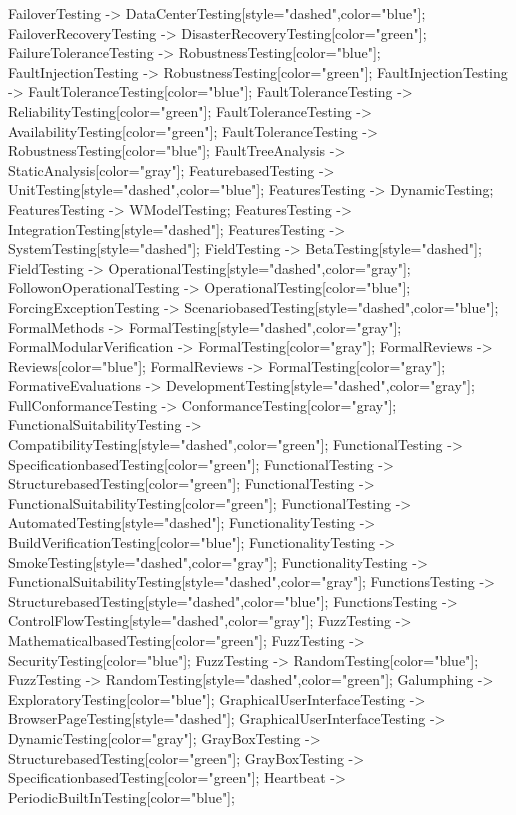 \documentclass{article}
\begin{document}
{FailoverTesting -> DataCenterTesting[style="dashed",color="blue"];
FailoverRecoveryTesting -> DisasterRecoveryTesting[color="green"];
FailureToleranceTesting -> RobustnessTesting[color="blue"];
FaultInjectionTesting -> RobustnessTesting[color="green"];
FaultInjectionTesting -> FaultToleranceTesting[color="blue"];
FaultToleranceTesting -> ReliabilityTesting[color="green"];
FaultToleranceTesting -> AvailabilityTesting[color="green"];
FaultToleranceTesting -> RobustnessTesting[color="blue"];
FaultTreeAnalysis -> StaticAnalysis[color="gray"];
FeaturebasedTesting -> UnitTesting[style="dashed",color="blue"];
FeaturesTesting -> DynamicTesting;
FeaturesTesting -> WModelTesting;
FeaturesTesting -> IntegrationTesting[style="dashed"];
FeaturesTesting -> SystemTesting[style="dashed"];
FieldTesting -> BetaTesting[style="dashed"];
FieldTesting -> OperationalTesting[style="dashed",color="gray"];
FollowonOperationalTesting -> OperationalTesting[color="blue"];
ForcingExceptionTesting -> ScenariobasedTesting[style="dashed",color="blue"];
FormalMethods -> FormalTesting[style="dashed",color="gray"];
FormalModularVerification -> FormalTesting[color="gray"];
FormalReviews -> Reviews[color="blue"];
FormalReviews -> FormalTesting[color="gray"];
FormativeEvaluations -> DevelopmentTesting[style="dashed",color="gray"];
FullConformanceTesting -> ConformanceTesting[color="gray"];
FunctionalSuitabilityTesting -> CompatibilityTesting[style="dashed",color="green"];
FunctionalTesting -> SpecificationbasedTesting[color="green"];
FunctionalTesting -> StructurebasedTesting[color="green"];
FunctionalTesting -> FunctionalSuitabilityTesting[color="green"];
FunctionalTesting -> AutomatedTesting[style="dashed"];
FunctionalityTesting -> BuildVerificationTesting[color="blue"];
FunctionalityTesting -> SmokeTesting[style="dashed",color="gray"];
FunctionalityTesting -> FunctionalSuitabilityTesting[style="dashed",color="gray"];
FunctionsTesting -> StructurebasedTesting[style="dashed",color="blue"];
FunctionsTesting -> ControlFlowTesting[style="dashed",color="gray"];
FuzzTesting -> MathematicalbasedTesting[color="green"];
FuzzTesting -> SecurityTesting[color="blue"];
FuzzTesting -> RandomTesting[color="blue"];
FuzzTesting -> RandomTesting[style="dashed",color="green"];
Galumphing -> ExploratoryTesting[color="blue"];
GraphicalUserInterfaceTesting -> BrowserPageTesting[style="dashed"];
GraphicalUserInterfaceTesting -> DynamicTesting[color="gray"];
GrayBoxTesting -> StructurebasedTesting[color="green"];
GrayBoxTesting -> SpecificationbasedTesting[color="green"];
Heartbeat -> PeriodicBuiltInTesting[color="blue"];
}
\end{document}
